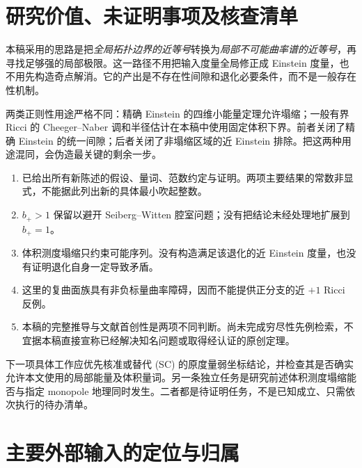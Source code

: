 \documentclass[UTF8,fontset=fandol,zihao=-4]{ctexart}
\theoremstyle{cn}
\numberwithin{equation}{section}
\begin{document}
\section{研究价值、未证明事项及核查清单}

本稿采用的思路是把\emph{全局拓扑边界的近等号}转换为\emph{局部不可能曲率谱的近等号}，再寻找足够强的局部极限。这一路径不用把输入度量全局修正成 Einstein 度量，也不用先构造奇点解消。它的产出是不存在性间隙和退化必要条件，而不是一般存在性机制。

两类正则性用途严格不同：精确 Einstein 的四维小能量定理允许塌缩；一般有界 Ricci 的 Cheeger--Naber 调和半径估计在本稿中使用固定体积下界。前者关闭了精确 Einstein 的统一间隙；后者关闭了非塌缩区域的近 Einstein 排除。把这两种用途混同，会伪造最关键的剩余一步。

\begin{enumerate}
\item 已给出所有新陈述的假设、量词、范数约定与证明。两项主要结果的常数非显式，不能据此列出新的具体最小吹起整数。
\item $b_+>1$ 保留以避开 Seiberg--Witten 腔室问题；没有把结论未经处理地扩展到 $b_+=1$。
\item 体积测度塌缩只约束可能序列。没有构造满足该退化的近 Einstein 度量，也没有证明退化自身一定导致矛盾。
\item 这里的复曲面族具有非负标量曲率障碍，因而不能提供正分支的近 $+1$ Ricci 反例。
\item 本稿的完整推导与文献首创性是两项不同判断。尚未完成穷尽性先例检索，不宜据本稿直接宣称已经解决知名问题或取得经认证的原创定理。
\end{enumerate}

下一项具体工作应优先核准或替代 (SC) 的原度量弱坐标结论，并检查其是否确实允许本文使用的局部能量及体积量词。另一条独立任务是研究前述体积测度塌缩能否与指定 monopole 地理同时发生。二者都是待证明任务，不是已知成立、只需依次执行的待办清单。

\appendix
\section{主要外部输入的定位与归属}
\end{document}
